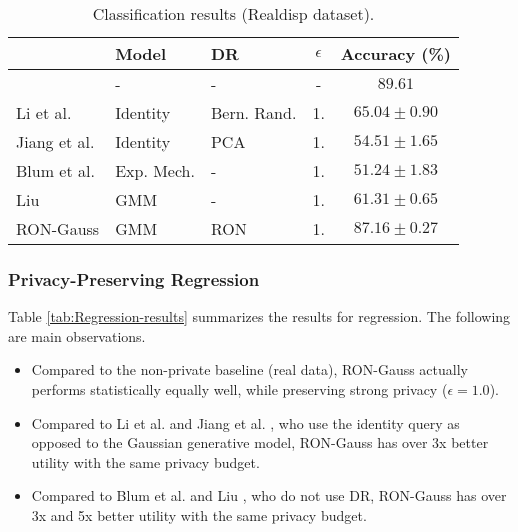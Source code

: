 \documentclass[USenglish,oneside,twocolumn]{article}
\providecommand{\tabularnewline}{\\}
\theoremstyle{definition}
\theoremstyle{remark}
\theoremstyle{plain}
\theoremstyle{plain}
\begin{document}
\begin{table}
\begin{centering}
\begin{tabular}{>{\centering}p{1.95cm}>{\centering}p{1.3cm}>{\centering}p{1.2cm}cc}
\toprule 
{Method }  & {Model }  & {DR}  & {$\epsilon$}  & {Accuracy (\%)}\tabularnewline
\midrule
\midrule 
{Real data }  & {- }  & {- }  & {- }  & {$89.61$}\tabularnewline
\midrule 
{Li et al. \cite{RefWorks:337} }  & {Identity }  & {Bern. Rand. }  & {1. }  & {$65.04\pm0.90$}\tabularnewline
\midrule 
{Jiang et al. \cite{RefWorks:339} }  & {Identity }  & {PCA} & {1. }  & {$54.51\pm1.65$}\tabularnewline
\midrule 
{Blum et al. \cite{RefWorks:174} }  & {Exp. Mech. }  & {- }  & {1. }  & {$51.24\pm1.83$}\tabularnewline
\midrule 
{Liu \cite{RefWorks:372} }  & {GMM }  & {- }  & {1. }  & {$61.31\pm0.65$}\tabularnewline
\midrule 
{RON-Gauss}  & {GMM }  & {RON}  & {1.}  & {$87.16\pm0.27$}\tabularnewline
\bottomrule
\end{tabular}
\par\end{centering}
\caption{Classification results (Realdisp dataset).\label{tab:The-classification-results}}
\vspace{-1em}
\end{table}




\vspace{-0.7em}
\subsubsection{Privacy-Preserving Regression}
\vspace{-1em}
Table \ref{tab:Regression-results} summarizes the results for regression.
The following are main observations. 
\begin{itemize}
\item Compared to the non-private baseline (real data), RON-Gauss actually
performs statistically equally well, while preserving strong privacy
($\epsilon=1.0$). 
\item Compared to Li et al. \cite{RefWorks:337} and Jiang et al. \cite{RefWorks:339},
who use the identity query as opposed to the Gaussian generative model,
RON-Gauss has over 3x better utility with the same privacy budget. 
\item Compared to Blum et al. \cite{RefWorks:174} and Liu \cite{RefWorks:372},
who do not use DR, RON-Gauss has over 3x and 5x better utility with
the same privacy budget.
\end{itemize}
\end{document}
